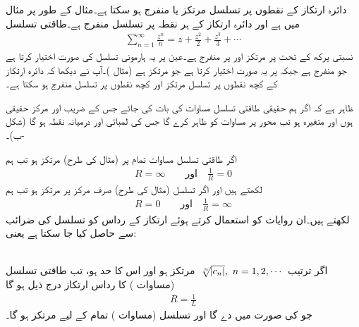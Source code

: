 دائرہ ارتکاز کے نقطوں پر تسلسل مرتکز یا منفرج ہو سکتا ہے۔مثال کے طور پر مثال   میں  ہے اور دائرہ ارتکاز  کے ہر نقطہ پر  تسلسل منفرج ہے۔طاقتی تسلسل
\begin{align*}
\sum\limits_{n=1}^{\infty} \frac{z^n}{n}=z+\frac{z^2}{2}+\frac{z^3}{3}+\cdots
\end{align*}
نسبتی پرکھ کے تحت  پر مرتکز اور  پر منفرج ہے۔عین  پر یہ ہارمونی تسلسل کی صورت اختیار کرتا ہے جو منفرج ہے جبکہ  پر یہ  صورت اختیار کرتا ہے جو مرتکز ہے (مثال )۔آپ نے دیکھا کہ دائرہ ارتکاز کے کچھ نقطوں پر تسلسل مرتکز اور کچھ نقطوں پر تسلسل منفرج ہو سکتا ہے۔

ظاہر ہے کہ اگر ہم حقیقی طاقتی تسلسل مساوات  کی بات کی جائے جس کے  ضریب  اور مرکز حقیقی ہوں اور  متغیرہ  ہو تب محور  پر  مساوات    کو ظاہر کرے گا جس کی لمبائی  اور درمیانہ نقطہ  ہو گا (شکل -ب)۔

اگر طاقتی تسلسل مساوات  تمام  پر (مثال  کی طرح) مرتکز ہو تب ہم
\begin{align*}
R=\infty\quad \quad \text{اور}\quad \frac{1}{R}=0
\end{align*} 
لکھتے ہیں اور اگر تسلسل (مثال  کی طرح) صرف مرکز  پر مرتکز ہو تب ہم
\begin{align*}
R=0\quad \quad \text{اور}\quad \frac{1}{R}=\infty
\end{align*}
لکھتے ہیں۔ان روایات کو استعمال کرتے ہوئے ارتکاز کے رداس  کو تسلسل کی ضرائب سے حاصل کیا جا سکتا ہے یعنی:

\quad {}\\
اگر ترتیب
$\,\sqrt[\leftroot{-2}n]{\abs{c_n}},\,\, n=1,2,\cdots\,$
مرتکز ہو اور اس کا حد  ہو، تب طاقتی تسلسل (مساوات ) کا رداس ارتکاز  درج ذیل ہو گا
\begin{align}\label{مساوات_ٹیلر_رداس_ارتکاز_الف}
R=\frac{1}{L}
\end{align}
جو  کی صورت میں  دے گا اور تسلسل  (مساوات ) تمام  کے لیے مرتکز ہو گا۔

